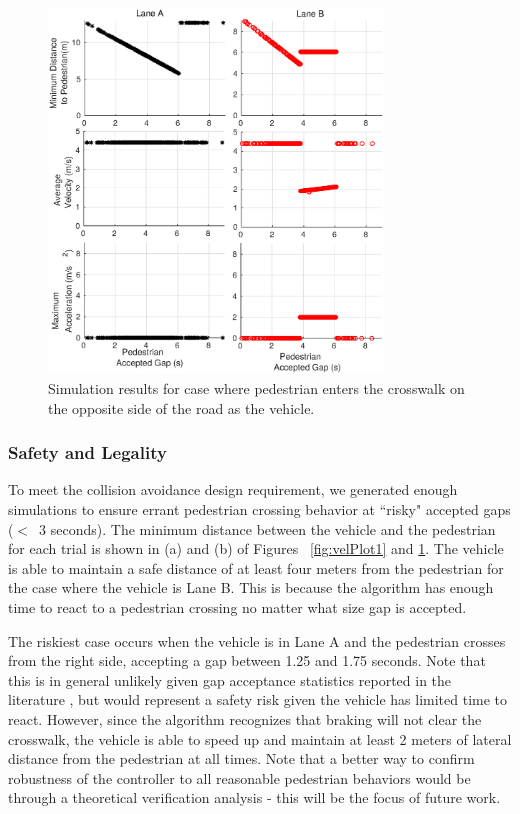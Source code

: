 \documentclass[letterpaper, 10 pt, conference]{ieeeconf}  %
\begin{document}
\begin{figure}
\centering
\includegraphics[width=3.5in]{figures/velPlot2.eps}
\caption{Simulation results for case where pedestrian enters the crosswalk on the opposite side of the road as the vehicle.}
\label{fig:velPlot2}
\end{figure}

\subsubsection{Safety and Legality}

To meet the collision avoidance design requirement, we generated enough simulations to ensure errant pedestrian crossing behavior at ``risky" accepted gaps ($<$~3 seconds). The minimum distance between the vehicle and the pedestrian for each trial is shown in (a) and (b) of Figures ~\ref{fig:velPlot1} and \ref{fig:velPlot2}. The vehicle is able to maintain a safe distance of at least four meters from the pedestrian for the case where the vehicle is Lane B. This is because the algorithm has enough time to react to a pedestrian crossing no matter what size gap is accepted. 

The riskiest case occurs when the vehicle is in Lane A and the pedestrian crosses from the right side, accepting a gap between 1.25 and 1.75 seconds. Note that this is in general unlikely given gap acceptance statistics reported in the literature \cite{Rasouli}\cite{Feliciani2017}, but would represent a safety risk given the vehicle has limited time to react. However, since the algorithm recognizes that braking will not clear the crosswalk, the vehicle is able to speed up and maintain at least 2 meters of lateral distance from the pedestrian at all times. Note that a better way to confirm robustness of the controller to all reasonable pedestrian behaviors would be through a theoretical verification analysis - this will be the focus of future work. 
\end{document}
